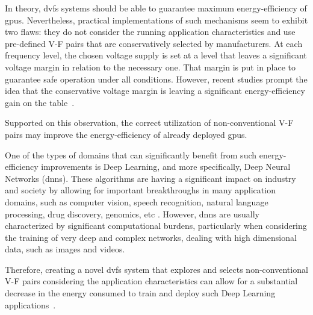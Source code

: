 In theory, \acrshort{dvfs} systems should be able to guarantee maximum energy-efficiency of \acrshort{gpu}s. Nevertheless, practical implementations of such mechanisms seem to exhibit two flaws: they do not consider the running application characteristics and use pre-defined V-F pairs that are conservatively selected by manufacturers. At each frequency level, the chosen voltage supply is set at a level that leaves a significant voltage margin in relation to the necessary one. That margin is put in place to guarantee safe operation under all conditions. However, recent studies prompt the idea that the conservative voltage margin is leaving a significant energy-efficiency gain on the table~\cite{leng_safe_2015}. 

Supported on this observation, the correct utilization of non-conventional V-F pairs may improve the energy-efficiency of already deployed \acrshort{gpu}s.

One of the types of domains that can significantly benefit from such energy-efficiency improvements is Deep Learning, and more specifically, Deep Neural Networks (\acrshort{dnn}s). These algorithms are having a significant impact on industry and society by allowing for important breakthroughs in many application domains, such as computer vision, speech recognition, natural language processing, drug discovery, genomics, etc \cite{shrestha_review_2019}. However, \acrshort{dnn}s are usually characterized by significant computational burdens, particularly when considering the training of very deep and complex networks, dealing with high dimensional data, such as images and videos. 

Therefore, creating a novel \acrshort{dvfs} system that explores and selects non-conventional V-F pairs considering the application characteristics can allow for a substantial decrease in the energy consumed to train and deploy such Deep Learning applications~\cite{tang_impact_2019}.





